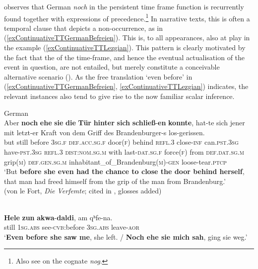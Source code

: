 \textcite{Shetter1966} observes that German \textit{noch} in the persistent time frame function is recurrently found together with expressions of precedence.\footnote{Also see \textcite{Rombouts1979} on the  cognate \textit{nog}.} In narrative texts, this is often a temporal clause that depicts a non-occurrence, as in (\ref{exContinuativeTTGermanBefreien}). This is, to all appearances, also at play in the  example (\ref{exContinuativeTTLezgian}). This pattern is clearly motivated by the fact that the  of the time-frame, and hence the eventual actualisation of the event in question, are not entailed, but merely constitute a conceivable alternative scenario (). As the free translation \lq even before' in (\ref{exContinuativeTTGermanBefreien}, \ref{exContinuativeTTLezgian}) indicates, the relevant instances also tend to give rise to the now familiar scalar inference. 

\begin{exe}
		\ex German\label{exContinuativeTTGermanBefreien}\\
		\gll
		Aber \textbf{noch} \textbf{ehe} \textbf{sie} \textbf{die} \textbf{Tür} \textbf{hinter} \textbf{sich} \textbf{schließ}-\textbf{en} \textbf{konnte}, hat-te sich jener mit letzt-er Kraft von dem Griff des Brandenburger-s los-gerissen.\\
but still before 3\textsc{sg}.\textsc{f} \textsc{def}.\textsc{acc}.\textsc{sg}.\textsc{f} door(\textsc{f}) behind \textsc{refl}.3 close-\textsc{inf} can.\textsc{pst}.3\textsc{sg} have-\textsc{pst}.3\textsc{sg} \textsc{refl}.3 \textsc{dist}:\textsc{nom}.\textsc{sg}.\textsc{m} with last-\textsc{dat}.\textsc{sg}.\textsc{f} force(\textsc{f}) from \textsc{def}.\textsc{dat}.\textsc{sg}.\textsc{m} grip(\textsc{m}) \textsc{def}.\textsc{gen}.\textsc{sg}.\textsc{m} inhabitant\_of\_Brandenburg(\textsc{m})-\textsc{gen} loose-tear.\textsc{ptcp}\\
		\glt \lq But \textbf{before she even had the chance to close the door behind herself}, that man had freed himself from the grip of the man from Brandenburg.'\\(von le Fort, \textit{Die Verfemte}; cited in \cite[57]{Shetter1966},  glosses added)

	\ex\label{exContinuativeTTLezgian}\\
	\gll \textbf{Hele} \textbf{zun} \textbf{akwa}-\textbf{daldi}, am qʰfe-na.\\
	still 1\textsc{sg}.\textsc{abs} see-\textsc{cvb}:before 3\textsc{sg}.\textsc{abs} leave-\textsc{aor}\\
	\glt \lq \textbf{Even before she saw me}, she left. / \textbf{Noch ehe sie mich sah}, ging sie weg.' \parencite[90]{Haspelmath1991}
\end{exe}
	
